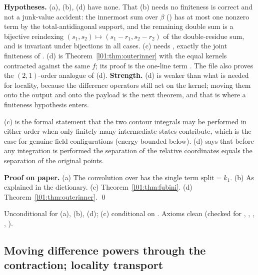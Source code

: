\begin{dictionary}
\textbf{Hypotheses.} (a), (b), (d) have none. That (b) needs no finiteness is correct and not a junk-value accident: the
innermost sum over $\beta$ () has at most one nonzero term by the total-antidiagonal support, and the remaining
double sum is a bijective reindexing $(s_1,s_2)\mapsto(s_1-r_1,s_2-r_2)$ of the double-residue sum, and  is
invariant under bijections in all cases. (c) needs , exactly the joint finiteness of
. (d) is Theorem~\ref{l01:thm:outerinner} with the equal kernels contracted against the same $f$; its
proof is the one-line term . The file also proves the
$(2,1)$-order analogue of (d). \textbf{Strength.} (d) is weaker than what is needed for locality, because the difference
operators still act on the kernel; moving them onto the output and onto the payload is the next theorem, and that is
where a finiteness hypothesis enters.
\end{dictionary}

\begin{physics}
(c) is the formal statement that the two contour integrals may be performed in either order when only finitely many
intermediate states contribute, which is the case for genuine field configurations (energy bounded below). (d) says that
before any integration is performed the separation of the relative coordinates equals the separation of the original
points.
\end{physics}

\textbf{Proof on paper.} (a) The convolution over  has the single term $\text{split} = k_1$. (b) As explained in
the dictionary. (c) Theorem~\ref{l01:thm:fubini}. (d) Theorem~\ref{l01:thm:outerinner}. \qed

\begin{status}
Unconditional for (a), (b), (d); (c) conditional on . Axioms clean (checked for
, , ,
, ).
\end{status}

\subsection{Moving difference powers through the contraction; locality transport}

